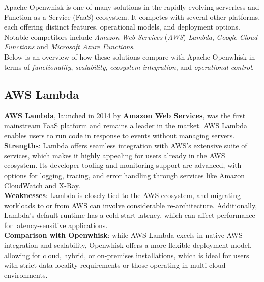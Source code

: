 Apache Openwhisk is one of many solutions in the rapidly evolving serverless and Function-as-a-Service (FaaS) ecosystem. It competes with several other platforms, each offering distinct features, operational models, and deployment options.\vspace{14pt}\\
Notable competitors include \textit{Amazon Web Services} (\textit{AWS}) \textit{Lambda}, \textit{Google Cloud Functions} and \textit{Microsoft Azure Functions}.\\
Below is an overview of how these solutions compare with Apache Openwhisk in terms of \textit{functionality}, \textit{scalability}, \textit{ecosystem integration}, and \textit{operational control}.
\subsection{AWS Lambda}
\textbf{AWS Lambda}, launched in 2014 by \textbf{Amazon Web Services}, was the first mainstream FaaS platform and remains a leader in the market. AWS Lambda enables users to run code in response to events without managing servers.\vspace{14pt}\\
\textbf{Strengths}: Lambda offers seamless integration with AWS’s extensive suite of services, which makes it highly appealing for users already in the AWS ecosystem. Its developer tooling and monitoring support are advanced, with options for logging, tracing, and error handling through services like Amazon CloudWatch and X-Ray.\vspace{14pt}\\
\textbf{Weaknesses}: Lambda is closely tied to the AWS ecosystem, and migrating workloads to or from AWS can involve considerable re-architecture. Additionally, Lambda’s default runtime has a cold start latency, which can affect performance for latency-sensitive applications.\vspace{14pt}\\
\textbf{Comparison with Openwhisk}: while AWS Lambda excels in native AWS integration and scalability, Openwhisk offers a more flexible deployment model, allowing for cloud, hybrid, or on-premises installations, which is ideal for users with strict data locality requirements or those operating in multi-cloud environments.
